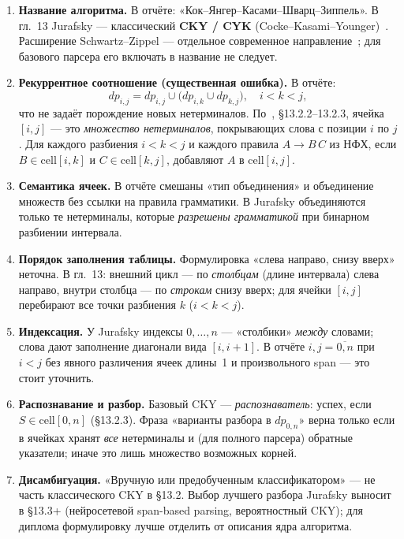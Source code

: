 \begin{enumerate}
	\item \textbf{Название алгоритма.}
	В отчёте: «Кок--Янгер--Касами--Шварц--Зиппель».
	В гл.~13 Jurafsky --- классический \textbf{CKY / CYK} (Cocke--Kasami--Younger)~\cite{younger1967recognition}.
	Расширение Schwartz--Zippel --- отдельное современное направление~\cite{makarov2022cyk}; для базового парсера его включать в название не следует.

	\item \textbf{Рекуррентное соотношение (существенная ошибка).}
	В отчёте:
	\[
		dp_{i,j} = dp_{i,j} \cup \bigl(dp_{i,k} \cup dp_{k,j}\bigr), \quad i<k<j,
	\]
	что не задаёт порождение новых нетерминалов.
	По~\cite{jurafsky2026speech}, \S13.2.2--13.2.3, ячейка $[i,j]$ --- это \emph{множество нетерминалов}, покрывающих слова с позиции $i$ по $j$.
	Для каждого разбиения $i<k<j$ и каждого правила $A \to B\,C$ из НФХ, если $B \in \mathrm{cell}[i,k]$ и $C \in \mathrm{cell}[k,j]$, добавляют $A$ в $\mathrm{cell}[i,j]$.

	\item \textbf{Семантика ячеек.}
	В отчёте смешаны «тип объединения» и объединение множеств без ссылки на правила грамматики.
	В Jurafsky объединяются только те нетерминалы, которые \emph{разрешены грамматикой} при бинарном разбиении интервала.

	\item \textbf{Порядок заполнения таблицы.}
	Формулировка «слева направо, снизу вверх» неточна.
	В гл.~13: внешний цикл --- по \emph{столбцам} (длине интервала) слева направо, внутри столбца --- по \emph{строкам} снизу вверх; для ячейки $[i,j]$ перебирают все точки разбиения $k$ ($i<k<j$).

	\item \textbf{Индексация.}
	У Jurafsky индексы $0,\ldots,n$ --- «столбики» \emph{между} словами; слова дают заполнение диагонали вида $[i,i{+}1]$.
	В отчёте $i,j = \overline{0,n}$ при $i<j$ без явного различения ячеек длины~1 и произвольного span --- это стоит уточнить.

	\item \textbf{Распознавание и разбор.}
	Базовый CKY --- \emph{распознаватель}: успех, если $S \in \mathrm{cell}[0,n]$ (\S13.2.3).
	Фраза «варианты разбора в $dp_{0,n}$» верна только если в ячейках хранят \emph{все} нетерминалы и (для полного парсера) обратные указатели; иначе это лишь множество возможных корней.

	\item \textbf{Дисамбигуация.}
	«Вручную или предобученным классификатором» --- не часть классического CKY в \S13.2.
	Выбор лучшего разбора Jurafsky выносит в \S13.3+ (нейросетевой span-based parsing, вероятностный CKY); для диплома формулировку лучше отделить от описания ядра алгоритма.


\end{enumerate}
